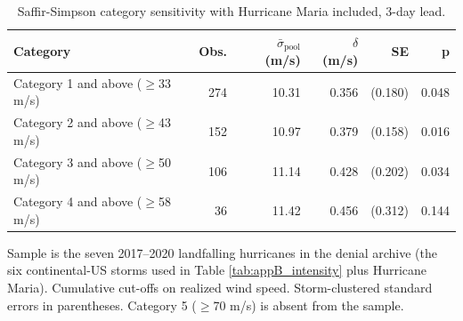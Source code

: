 \begin{table}

\caption{Saffir-Simpson category sensitivity with Hurricane Maria included, 3-day lead. \label{tab:appB_intensity_maria}}
\centering
\begin{threeparttable}
\begin{tabular}[t]{lrrrrr}
\toprule
Category & Obs. & $\bar{\sigma}_{\text{pool}}$ (m/s) & $\delta$ (m/s) & SE & p\\
\midrule
Category 1 and above ($\geq$33 m/s) & 274 & 10.31 & 0.356 & (0.180) & 0.048\\
Category 2 and above ($\geq$43 m/s) & 152 & 10.97 & 0.379 & (0.158) & 0.016\\
Category 3 and above ($\geq$50 m/s) & 106 & 11.14 & 0.428 & (0.202) & 0.034\\
Category 4 and above ($\geq$58 m/s) & 36 & 11.42 & 0.456 & (0.312) & 0.144\\
\bottomrule
\end{tabular}
\begin{tablenotes}
\small
\item Sample is the seven 2017--2020 landfalling hurricanes in the denial archive (the six continental-US storms used in Table \ref{tab:appB_intensity} plus Hurricane Maria). Cumulative cut-offs on realized wind speed. Storm-clustered standard errors in parentheses. Category 5 ($\geq$70 m/s) is absent from the sample.
\end{tablenotes}
\end{threeparttable}
\end{table}

